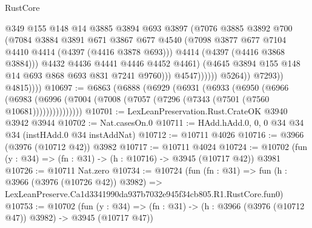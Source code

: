 \begin{lexlean}{RustCore}
\begin{coremodule}
                                    @349
                                    @155
                                    @148
                                    @14
                                    @3885
                                    @3894
                                    @693
                                    @3897
                                    (@7076
                                      @3885
                                      @3892
                                      @700
                                      (@7084
                                        @3884
                                        @3891
                                        @671
                                        @3867
                                        @677
                                        @4540
                                        (@7098
                                          @3877
                                          @677
                                          @7104
                                          @4410
                                          @4414
                                          (@4397 (@4416 @3878 @693)))
                                        @4414
                                        (@4397 (@4416 @3868 @3884)))
                                      @4432
                                      @4436
                                      @4441
                                      @4446
                                      @4452
                                      @4461)
                                    (@4645 @3894 @155 @148 @14 @693 @868 @693 @831 @7241 @9760)))
                                @4547))))))
                    @5264))
                @7293))
            @4815))))
@10697 := @6863
    (@6888
      (@6929
        (@6931
          (@6933
            (@6950
              (@6966
                (@6983 (@6996 (@7004 (@7008 (@7057 (@7296 (@7343 (@7501 (@7560 @10681)))))))))))))))
@10701 := LexLeanPreservation.Rust.CrateOK @3940 @3942 @3944
@10702 := Nat.casesOn.{0}
@10711 := HAdd.hAdd.{0, 0, 0} @34 @34 @34 (instHAdd.{0} @34 instAddNat)
@10712 := @10711 @4026
@10716 := @3966 (@3976 (@10712 @42)) @3982
@10717 := @10711 @4024
@10724 := @10702 (fun (y : @34) => (fn : @31) -> (h : @10716) -> @3945 (@10717 @42)) @3981
@10726 := @10711 Nat.zero
@10734 := @10724
    (fun (fn : @31) =>
    fun (h : @3966 (@3976 (@10726 @42)) @3982) =>
    LexLeanPreserve.Ca1d3341990da937b7032e945f34cb805.R1.RustCore.fun0)
@10753 := @10702
    (fun (y : @34) => (fn : @31) -> (h : @3966 (@3976 (@10712 @47)) @3982) -> @3945 (@10717 @47))

\end{coremodule}
\end{lexlean}
